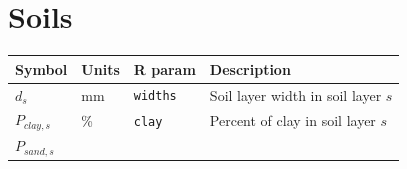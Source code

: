 \documentclass[]{book}
\begin{document}
\section{Soils}\label{soils}

\begin{longtable}[]{@{}llll@{}}
\toprule
\begin{minipage}[b]{0.11\columnwidth}\raggedright\strut
Symbol\strut
\end{minipage} & \begin{minipage}[b]{0.10\columnwidth}\raggedright\strut
Units\strut
\end{minipage} & \begin{minipage}[b]{0.12\columnwidth}\raggedright\strut
R param\strut
\end{minipage} & \begin{minipage}[b]{0.45\columnwidth}\raggedright\strut
Description\strut
\end{minipage}\tabularnewline
\midrule
\endhead
\begin{minipage}[t]{0.11\columnwidth}\raggedright\strut
\(d_{s}\)\strut
\end{minipage} & \begin{minipage}[t]{0.10\columnwidth}\raggedright\strut
mm\strut
\end{minipage} & \begin{minipage}[t]{0.12\columnwidth}\raggedright\strut
\texttt{widths}\strut
\end{minipage} & \begin{minipage}[t]{0.45\columnwidth}\raggedright\strut
Soil layer width in soil layer \(s\)\strut
\end{minipage}\tabularnewline
\begin{minipage}[t]{0.11\columnwidth}\raggedright\strut
\(P_{clay,s}\)\strut
\end{minipage} & \begin{minipage}[t]{0.10\columnwidth}\raggedright\strut
\%\strut
\end{minipage} & \begin{minipage}[t]{0.12\columnwidth}\raggedright\strut
\texttt{clay}\strut
\end{minipage} & \begin{minipage}[t]{0.45\columnwidth}\raggedright\strut
Percent of clay in soil layer \(s\)\strut
\end{minipage}\tabularnewline
\begin{minipage}[t]{0.11\columnwidth}\raggedright\strut
\(P_{sand,s}\)\strut
\end{minipage} & \begin{minipage}[t]{0.10\columnwidth}\raggedright\strut

\end{minipage}
\end{longtable}
\end{document}
